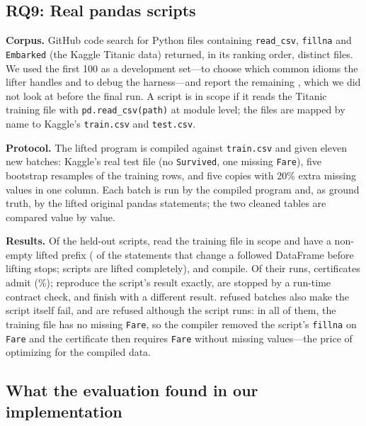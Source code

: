 \documentclass[conference]{IEEEtran}
\begin{document}
\subsection{RQ9: Real pandas scripts}

\textbf{Corpus.} GitHub code search for Python files containing \texttt{read\_csv},
\texttt{fillna} and \texttt{Embarked} (the Kaggle Titanic data) returned, in its ranking order,
\CorpusAll{} distinct files. We used the first 100 as a development set---to choose which common
idioms the lifter handles and to debug the harness---and report the remaining \CorpusTest{}, which
we did not look at before the final run. A script is in scope if it reads the Titanic training file
with \texttt{pd.read\_csv(path)} at module level; the files are mapped by name to Kaggle's
\texttt{train.csv} and \texttt{test.csv}.

\textbf{Protocol.} The lifted program is compiled against \texttt{train.csv} and given eleven new
batches: Kaggle's real test file (no \texttt{Survived}, one missing \texttt{Fare}), five bootstrap
resamples of the training rows, and five copies with 20\% extra missing values in one column. Each
batch is run by the compiled program and, as ground truth, by the lifted original pandas statements;
the two cleaned tables are compared value by value.

\textbf{Results.} Of the \CorpusTest{} held-out scripts, \CorpusLifted{} read the training file in
scope and have a non-empty lifted prefix (\CorpusStatements{} of the \CorpusChanges{} statements that
change a followed DataFrame before lifting stops; \CorpusComplete{} scripts are lifted completely),
and \CorpusCompiled{} compile. Of their \CorpusRuns{} runs, certificates admit \CorpusAdmit{}
(\CorpusAdmitPct\%); \CorpusSame{} reproduce the script's result exactly, \CorpusStopped{} are
stopped by a run-time contract check, and \CorpusUnsound{} finish with a different result.
\CorpusRefusedCrash{} refused batches also make the script itself fail, and \CorpusRefusedRuns{} are
refused although the script runs: in all of them, the training file has no missing \texttt{Fare}, so the
compiler removed the script's \texttt{fillna} on \texttt{Fare} and the certificate then requires
\texttt{Fare} without missing values---the price of optimizing for the compiled data.

\subsection{What the evaluation found in our implementation}
\end{document}
